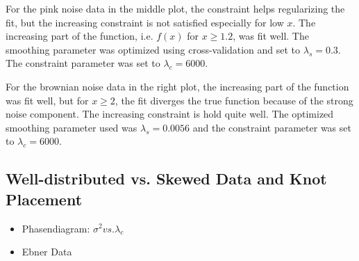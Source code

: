 \documentclass[10pt,a4paper]{article}
\begin{document}
For the pink noise data in the middle plot, the constraint helps regularizing the fit, but the increasing constraint is not satisfied especially for low $x$. The increasing part of the function, i.e. $f(x)$ for $x \ge 1.2$,  was fit well. The smoothing parameter was optimized using cross-validation and set to $\lambda_s = 0.3$. The constraint parameter was set to $\lambda_c = 6000$. 

For the brownian noise data in the right plot, the increasing part of the function was fit well, but for $x \ge 2$, the fit diverges the true function because of the strong noise component. The increasing constraint is hold quite well. The optimized smoothing parameter used was $\lambda_s = 0.0056$ and the constraint parameter was set to $\lambda_c = 6000$.

\subsection{Well-distributed vs. Skewed Data and Knot Placement}


\begin{itemize}
	\item Phasendiagram: $\sigma^2 vs. \lambda_c$
	\item Ebner Data
\end{itemize}
\end{document}

